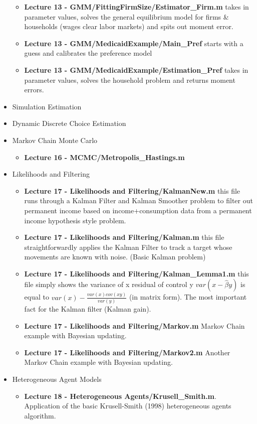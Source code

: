 \documentclass[a4paper]{article}
\begin{document}
\begin{itemize}
\begin{itemize}
\item \textbf{Lecture 13 - GMM/FittingFirmSize/Estimator\_Firm.m} takes in parameter values, solves the general equilibrium model for firms \& households (wages clear labor markets) and spits out moment error.
\item \textbf{Lecture 13 - GMM/MedicaidExample/Main\_Pref} starts with a guess and calibrates the preference model
\item \textbf{Lecture 13 - GMM/MedicaidExample/Estimation\_Pref} takes in parameter values, solves the household problem and returns moment errors.
\end{itemize}
\item Simulation Estimation
\item Dynamic Discrete Choice Estimation
\item Markov Chain Monte Carlo
\begin{itemize}
\item \textbf{Lecture 16 - MCMC/Metropolis\_Hastings.m}
\end{itemize}
\item Likelihoods and Filtering
\begin{itemize}
\item \textbf{Lecture 17 - Likelihoods and Filtering/KalmanNew.m} this file runs through a Kalman Filter and Kalman Smoother problem to filter out permanent income based on income+consumption data from a permanent income hypothesis style problem.
\item \textbf{Lecture 17 - Likelihoods and Filtering/Kalman.m} this file straightforwardly applies the Kalman Filter to track a target whose movements are known with noise. (Basic Kalman problem)
\item \textbf{Lecture 17 - Likelihoods and Filtering/Kalman\_Lemma1.m} this file simply shows the variance of x residual of control y $var(x-\hat{\beta}y)$ is equal to $var(x)-\frac{var(x)cov(xy)}{var(y)}$ (in matrix form).  The most important fact for the Kalman filter (Kalman gain).
\item \textbf{Lecture 17 - Likelihoods and Filtering/Markov.m} Markov Chain example with Bayesian updating.
\item \textbf{Lecture 17 - Likelihoods and Filtering/Markov2.m} Another Markov Chain example with Bayesian updating.
\end{itemize}
\item Heterogeneous Agent Models
\begin{itemize}
\item \textbf{Lecture 18 - Heterogeneous Agents/Krusell\_Smith.m}. Application of the basic Krusell-Smith (1998) heterogeneous agents algorithm.
\end{itemize}
\end{itemize}
\end{document}
